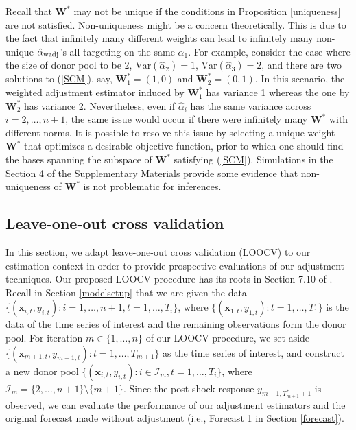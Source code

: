 \documentclass[11pt]{article}
\def\mbf#1{\mathbf{#1}} %
\def\mc#1{\mathcal{#1}} %
\def\var#1{\mathrm{Var}(#1)} %
\theoremstyle{definition}
\begin{document}
Recall that $\mathbf{W}^*$  may not be unique if the conditions in Proposition \ref{uniqueness} are not satisfied. Non-uniqueness might be a concern theoretically. This is due to the fact that infinitely many different weights can lead to infinitely many non-unique $\hat{\alpha}_{\rm wadj}$'s all targeting on the same $\alpha_1$. For example, consider the case where the size of  donor pool to be 2, $\var{\hat{\alpha}_2}=1$, $\var{\hat{\alpha}_3}=2$, and there are two solutions to (\ref{SCM}), say, $\mathbf{W}^*_1=(1,0)$ and  $\mathbf{W}^*_2=(0,1)$. In this scenario, the weighted adjustment estimator induced by $\mathbf{W}^*_1$ has variance 1 whereas the one by $\mathbf{W}^*_2$ has variance 2. Nevertheless, even if $\hat{\alpha}_i$ has the same variance across $i = 2, \ldots, n+1$, the same issue would occur if there were infinitely many $\mbf{W}^*$ with different norms. It is possible to resolve this issue by selecting a unique weight $\mbf{W}^*$ that optimizes a desirable objective function, prior to which one should find the bases spanning the subspace of $\mbf{W}^*$ satisfying (\ref{SCM}). Simulations in the Section 4 of the Supplementary Materials provide some evidence that non-uniqueness of $\mathbf{W}^*$ is not problematic for inferences.


\subsection{Leave-one-out cross validation}
\label{loocv}

In this section, we adapt leave-one-out cross validation (LOOCV) to our estimation context in order to provide prospective evaluations of our adjustment techniques. Our proposed LOOCV procedure has its roots in Section 7.10 of \citet{hastie2009elements}.  Recall in Section \ref{modelsetup} that we are given the data $\{(\mbf{x}_{i,t}, y_{i,t}) \colon i = 1, \ldots, n+1, t = 1, \ldots, T_i\}$, where $\{(\mbf{x}_{1,t}, y_{1,t})\colon t = 1, \ldots, T_1\}$ is the data of the time series of interest and the remaining observations form the donor pool. For iteration $m \in \{1,\ldots,n\}$ of our LOOCV procedure, we set aside $\{(\mbf{x}_{m + 1, t}, y_{m + 1, t}) \colon t = 1, \ldots, T_{m+1}\}$ as the time series of interest, and construct a new donor pool $\{(\mbf{x}_{i, t}, y_{i, t}) \colon i \in \mc{I}_m, t = 1, \ldots, T_{i}\}$, where $\mc{I}_m=\{2, \ldots, n+1\} \setminus \{m+1\}$. Since the post-shock response $y_{m+1, T_{m+1}^*+1}$ is observed, we can evaluate the performance of our adjustment estimators and the original forecast made without adjustment (i.e., Forecast 1 in Section \ref{forecast}).
\end{document}
